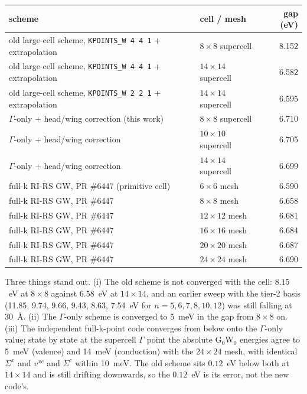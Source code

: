 \documentclass[11pt,a4paper]{article}
\begin{document}
\begin{center}
\begin{tabular}{llr}
\toprule
scheme & cell / mesh & gap (eV)\\
\midrule
old large-cell scheme, \texttt{KPOINTS\_W 4 4 1} + extrapolation & $8\times8$ supercell & 8.152\\
old large-cell scheme, \texttt{KPOINTS\_W 4 4 1} + extrapolation & $14\times14$ supercell & 6.582\\
old large-cell scheme, \texttt{KPOINTS\_W 2 2 1} + extrapolation & $14\times14$ supercell & 6.595\\
\midrule
$\Gamma$-only + head/wing correction (this work) & $8\times8$ supercell & 6.710\\
$\Gamma$-only + head/wing correction & $10\times10$ supercell & 6.705\\
$\Gamma$-only + head/wing correction & $14\times14$ supercell & 6.699\\
\midrule
full-k RI-RS GW, PR \#6447 (primitive cell) & $6\times6$ mesh & 6.590\\
full-k RI-RS GW, PR \#6447 & $8\times8$ mesh & 6.658\\
full-k RI-RS GW, PR \#6447 & $12\times12$ mesh & 6.681\\
full-k RI-RS GW, PR \#6447 & $16\times16$ mesh & 6.684\\
full-k RI-RS GW, PR \#6447 & $20\times20$ mesh & 6.687\\
full-k RI-RS GW, PR \#6447 & $24\times24$ mesh & 6.690\\
\bottomrule
\end{tabular}
\end{center}

Three things stand out. (i) The old scheme is not converged with the cell: $8.15$~eV at
$8\times8$ against $6.58$~eV at $14\times14$, and an earlier sweep with the tier-2 basis
(11.85, 9.74, 9.66, 9.43, 8.63, 7.54~eV for $n = 5, 6, 7, 8, 10, 12$) was still falling at
30~\AA. (ii) The $\Gamma$-only scheme is converged to 5~meV in the gap from $8\times8$ on.
(iii) The independent full-k-point code converges from below onto the $\Gamma$-only value;
state by state at the supercell $\Gamma$ point the absolute G$_0$W$_0$ energies agree to 5~meV
(valence) and 14~meV (conduction) with the $24\times24$ mesh, with identical $\Sigma^x$ and
$v^{xc}$ and $\Sigma^c$ within 10~meV. The old scheme sits $0.12$~eV below both at
$14\times14$ and is still drifting downwards, so the $0.12$~eV is its error, not the new
code's.
\end{document}
